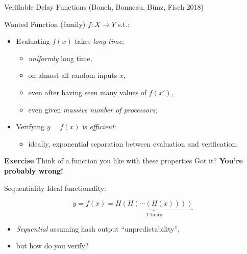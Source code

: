 \documentclass[aspectratio=169]{beamer}
\begin{document}
\begin{frame}{Verifiable Delay Functions (Boneh, Bonneau, Bünz, Fisch 2018)}
  \begin{block}{Wanted}
    Function (family) \emph{$f:X\to Y$} s.t.:

    \begin{itemize}
    \item Evaluating $f(x)$ takes \emph{long time}:
      \begin{itemize}
      \item \emph{uniformly} long time,
      \item on almost all random inputs $x$,
      \item even after having seen many values of $f(x')$,
      \item even given \emph{massive number of processors};
      \end{itemize}
    \item Verifying $y=f(x)$ is \emph{efficient}:
      \begin{itemize}
      \item ideally, exponential separation between evaluation and
        verification.
      \end{itemize}
    \end{itemize}
  \end{block}

  \centering
  \pause\vfill
  \textbf{Exercise}
  \pause\vfill
  Think of a function you like with these properties
  \pause\vfill
  Got it?
  \pause\vfill
  \textbf{You're probably wrong!}
\end{frame}


\begin{frame}{Sequentiality}
  Ideal functionality:

  \[y = f(x) = \underbrace{H(H(\cdots(H(x))))}_{T \text{ times}}\]

  \begin{itemize}
  \item \emph{Sequential} assuming hash output ``unpredictability'',
  \item but how do you verify?
  \end{itemize}
\end{frame}

\end{document}
